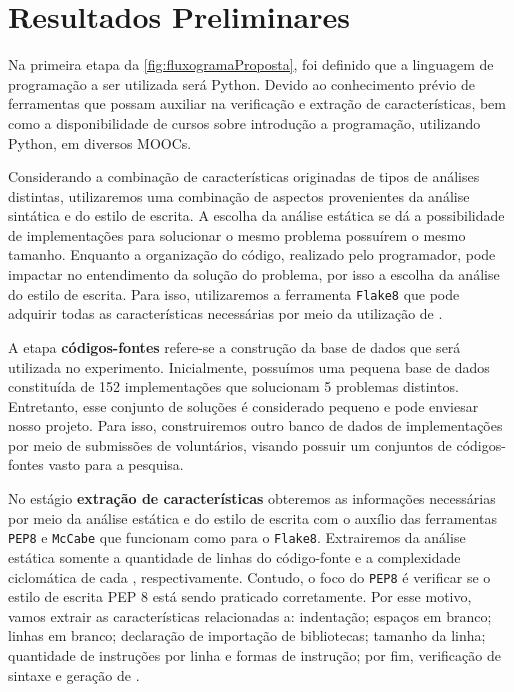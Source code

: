 \chapter{Resultados Preliminares}
\label{chap:Result}

	Na primeira etapa da \cref{fig:fluxogramaProposta}, foi definido que a linguagem
	de programação a ser utilizada será Python. Devido ao conhecimento prévio de
	ferramentas que possam auxiliar na verificação e extração de características,
	bem como a disponibilidade de cursos sobre introdução a programação, utilizando
	Python, em diversos MOOCs.
	
	Considerando a combinação de características originadas de tipos de análises
	distintas, utilizaremos uma combinação de aspectos provenientes da análise
	sintática e do estilo de escrita. A escolha da análise estática se dá a
	possibilidade de implementações para solucionar o mesmo problema possuírem
	o mesmo tamanho. Enquanto a organização do código, realizado pelo programador,
	pode impactar no entendimento da solução do problema, por isso a escolha da
	análise do estilo de escrita. Para isso, utilizaremos a ferramenta \texttt{Flake8}
	\cite{flake8} que pode adquirir todas as características necessárias por meio da
	utilização de .
	
	A etapa \textbf{códigos-fontes} refere-se a construção da base de dados que será
	utilizada no experimento. Inicialmente, possuímos uma pequena base de dados
	constituída de 152 implementações que solucionam 5 problemas distintos. Entretanto,
	esse conjunto de soluções é considerado pequeno e pode enviesar nosso projeto.
	Para isso, construiremos outro banco de dados de implementações por meio de
	submissões de voluntários, visando possuir um conjuntos de códigos-fontes vasto
	para a pesquisa. 
	
	No estágio \textbf{extração de características} obteremos as informações necessárias
	por meio da análise estática e do estilo de escrita com o auxílio das ferramentas
	\texttt{PEP8} e \texttt{McCabe} que funcionam como  para o
	\texttt{Flake8}. Extrairemos da análise estática somente a quantidade de linhas
	do código-fonte e a complexidade ciclomática de cada ,
	respectivamente. Contudo, o foco do \texttt{PEP8} é verificar se o estilo de
	escrita PEP 8 \cite{van2001pep} está sendo praticado corretamente. Por esse
	motivo, vamos extrair as características relacionadas a: indentação; espaços em
	branco; linhas em branco; declaração de importação de bibliotecas; tamanho da
	linha; quantidade de instruções por linha e formas de instrução;
	por fim, verificação de sintaxe e geração de .
	
